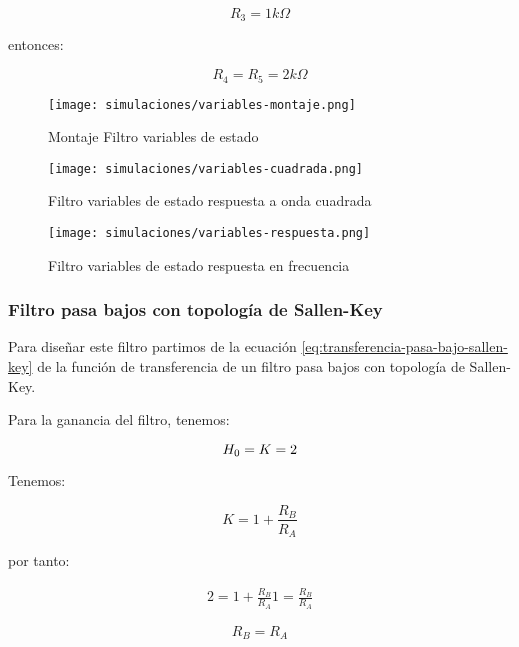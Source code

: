 $$\boxed{R_3 = 1k\Omega}$$

entonces:

\begin{equation*}
    \boxed{R_4 = R_5 = 2k\Omega}
\end{equation*}


\begin{figure}[ht]
    \centering
    \texttt{[image: simulaciones/variables-montaje.png]}
    \caption{Montaje Filtro variables de estado}\label{fig:sim-variables-montaje} 
\end{figure}

\begin{figure}[ht]
    \centering
    \texttt{[image: simulaciones/variables-cuadrada.png]}
    \caption{Filtro variables de estado respuesta a onda cuadrada  }
    \label{fig:sim-variables-cuadrada} 
\end{figure}

\begin{figure}[ht]
    \centering
    \texttt{[image: simulaciones/variables-respuesta.png]}
    \caption{Filtro variables de estado respuesta en frecuencia  }
\end{figure}

\FloatBarrier
\subsubsection{Filtro pasa bajos con topología de Sallen-Key}

Para diseñar este filtro partimos de la ecuación \ref{eq:transferencia-pasa-bajo-sallen-key} de la función de transferencia de un filtro pasa bajos con topología de Sallen-Key.

Para la ganancia del filtro, tenemos:

\begin{equation*}
    H_0 = K = 2
\end{equation*}

Tenemos:

\begin{equation}
    K = 1 + \frac{R_B}{R_A}
\end{equation}

por tanto:

\begin{align*}
    2 = 1 + \frac{R_B}{R_A}
    1 = \frac{R_B}{R_A}
\end{align*}

\begin{equation*}
    \boxed{R_B = R_A}
\end{equation*}


